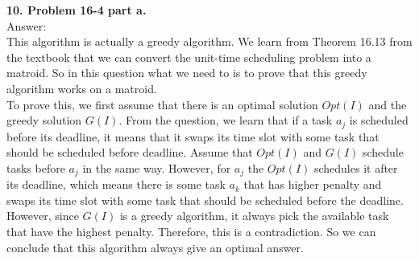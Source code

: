 \documentclass{article}
\begin{document}
\noindent
\textbf{10. Problem 16-4 part a.} \\ \newline
\noindent
Answer: \\ \newline
\noindent
This algorithm is actually a greedy algorithm. We learn from Theorem 16.13 from the textbook that we can convert the unit-time scheduling problem into a matroid. So in this question what we need to is to prove that this greedy algorithm works on a matroid. \\ \newline
To prove this, we first assume that there is an optimal solution $Opt(I)$ and the greedy solution $G(I)$. From the question, we learn that if a task $a_j$ is scheduled before its deadline, it means that it swaps its time slot with some task that should be scheduled before deadline. Assume that $Opt(I)$ and $G(I)$ schedule tasks before $a_j$ in the same way. However, for $a_j$ the $Opt(I)$ schedules it after its deadline, which means there is some task $a_k$ that has higher penalty and swaps its time slot with some task that should be scheduled before the deadline. However, since $G(I)$ is a greedy algorithm, it always pick the available task that have the highest penalty. Therefore, this is a contradiction. So we can conclude that this algorithm always give an optimal answer.
\end{document}
